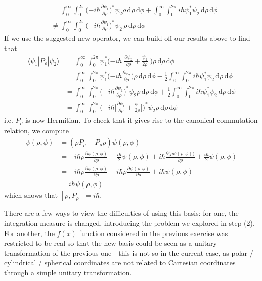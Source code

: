 \documentclass[../principles-of-quantum-mechanics.tex]{subfiles}
\begin{document}
\begin{questions}
\begin{solution}
\begin{align*}
				&= \int_0^{\infty}\int_0^{2\pi}\Big({-i\hbar}\frac{\partial\psi_1}{\partial \rho}\Big)^*\psi_2\rho\,\mathrm{d}\rho\,\mathrm{d}\phi + \int_0^\infty\int_0^{2\pi}i\hbar\psi_1^*\psi_2\,\mathrm{d}\rho\,\mathrm{d}\phi \\
				&\neq \int_0^{\infty}\int_0^{2\pi}\Big({-i\hbar}\frac{\partial \psi_1}{\partial\rho}\Big)^*\psi_2\,\rho\,\mathrm{d}\rho\,\mathrm{d}\phi
			\end{align*}
			If we use the suggested new operator, we can build off our results above to find that
			\begin{align*}
				\langle \psi_1|P_\rho|\psi_2\rangle &= \int_0^\infty\int_0^{2\pi}\psi_1^*\Big({-i\hbar}\Big[\frac{\partial \psi_2}{\partial \rho} + \frac{\psi_2}{2\rho}\Big]\Big)\rho\,\mathrm{d}\rho\,\mathrm{d}\phi \\
				&= \int_0^\infty\int_0^{2\pi}\psi_1^*\Big({-i\hbar}\frac{\partial \psi_2}{\partial \rho}\Big)\rho\,\mathrm{d}\rho\,\mathrm{d}\phi - \frac{1}{2}\int_0^\infty\int_0^{2\pi}i\hbar\psi_1^*\psi_2\,\mathrm{d}\rho\,\mathrm{d}\phi \\
				&= \int_0^{\infty}\int_0^{2\pi}\Big({-i\hbar}\frac{\partial\psi_1}{\partial \rho}\Big)^*\psi_2\rho\,\mathrm{d}\rho\,\mathrm{d}\phi + \frac{1}{2}\int_0^\infty\int_0^{2\pi}i\hbar\psi_1^*\psi_2\,\mathrm{d}\rho\,\mathrm{d}\phi \\
				&= \int_0^\infty\int_0^{2\pi}\Big({-i\hbar}\Big[\frac{\partial\psi_1}{\partial \rho} + \frac{\psi_1}{2\rho}\Big]\Big)^*\psi_2\rho\,\mathrm{d}\rho\,\mathrm{d}\phi
			\end{align*}
			i.e. $P_\rho$ is now Hermitian. To check that it gives rise to the canonical commutation relation, we compute
			\begin{align*}
				[\rho, P_\rho]\psi(\rho, \phi) &= (\rho P_\rho - P_\rho\rho)\psi(\rho, \phi) \\
				&= {-i\hbar}\rho\frac{\partial \psi(\rho, \phi)}{\partial \rho} - \frac{i\hbar}{2}\psi(\rho, \phi)  + i\hbar\frac{\partial\big(\rho\psi(\rho, \phi)\big)}{\partial\rho} + \frac{i\hbar}{2}\psi(\rho, \phi) \\ 
				&= {-i\hbar}\rho\frac{\partial\psi(\rho, \phi)}{\partial \rho} + i\hbar\rho\frac{\partial\psi(\rho, \phi)}{\partial \rho} + i\hbar\psi(\rho, \phi) \\
				&= i\hbar\psi(\rho, \phi)
			\end{align*}
			which shows that $[\rho, P_\rho] = i\hbar$.
			
			There are a few ways to view the difficulties of using this basis: for one, the integration measure is changed, introducing the problem we explored in step (2). For another, the $f(x)$ function considered in the previous exercise was restricted to be real so that the new basis could be seen as a unitary transformation of the previous one---this is not so in the current case, as polar / cylindrical / spherical coordinates are not related to Cartesian coordinates through a simple unitary transformation.
			

\end{solution}
\end{questions}
\end{document}

